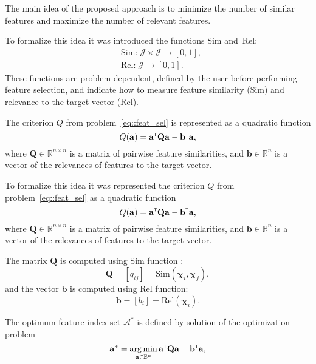 \documentclass[a4paper,12pt]{article}
\theoremstyle{plain} %
\theoremstyle{definition} %
\theoremstyle{remark} %
\newcommand{\cA}{\mathcal{A}}
\newcommand{\T}{{\text{\tiny\sffamily\upshape\mdseries T}}}
\newcommand{\argmin}{\mathop{\arg \min}\limits}
\begin{document}
	The main idea of the proposed approach is to minimize the number of similar features and maximize the number of relevant features. 
	
	To formalize this idea it was introduced the functions Sim and~Rel:
	\begin{equation}
	\begin{split}
	&\text{Sim:} \; \mathcal{J} \times \mathcal{J} \rightarrow [0, 1],\\
	&\text{Rel:} \; \mathcal{J} \rightarrow [0, 1].
	\end{split}
	\end{equation}
	These functions are problem-dependent, defined by the user before performing feature selection, and indicate how to measure feature similarity (Sim) and relevance to the target vector (Rel).
	
	The criterion $Q$ from problem~\eqref{eq::feat_sel} is represented  as a quadratic function
	\begin{equation}
	Q(\mathbf{a}) = \mathbf{a}^{\T}\mathbf{Q} \mathbf{a} - \mathbf{b}^{\T} \mathbf{a},
	\label{eq::quad_form}
	\end{equation}
	where $\mathbf{Q} \in \mathbb{R}^{n \times n}$ is a matrix of pairwise feature similarities, and $\mathbf{b} \in \mathbb{R}^n$ is a vector of the relevances of features to the target vector. 
	
	To formalize this idea it was represented the criterion $Q$ from problem~\eqref{eq::feat_sel} as a quadratic function
	\begin{equation}
	Q(\mathbf{a}) = \mathbf{a}^{\T}\mathbf{Q} \mathbf{a} - \mathbf{b}^{\T} \mathbf{a},
	\label{eq::quad_form}
	\end{equation}
	where $\mathbf{Q} \in \mathbb{R}^{n \times n}$ is a matrix of pairwise feature similarities, and $\mathbf{b} \in \mathbb{R}^n$ is a vector of the relevances of features to the target vector. 

	The matrix $\mathbf{Q}$ is computed using Sim function :
	\begin{equation}
	\mathbf{Q} = [q_{ij}] = 
	\text{Sim}\left(\boldsymbol{\chi}_i, \boldsymbol{\chi}_j\right),
	\label{eq::sim}
	\end{equation}
	and the vector $\mathbf{b}$ is computed using Rel function:
	\begin{equation}
	\mathbf{b} = [b_i] = \text{Rel}\left(\boldsymbol{\chi}_i \right).
	\label{eq::rel}
	\end{equation}
	
	The optimum feature index set $\cA^*$ is defined by solution of the optimization problem
	\begin{equation}
	\mathbf{a}^* = \argmin_{\mathbf{a} \in \mathbb{B}^n} \mathbf{a}^{\T}\mathbf{Q} \mathbf{a} - \mathbf{b}^{\T}\mathbf{a},
	\label{eq::feat_sel_quad}
	\end{equation}
	
\end{document}
